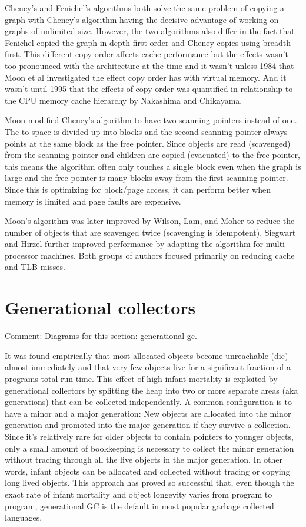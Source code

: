 \documentclass[a4paper,oneside]{memoir}
\newcommand{\makecomment}[1]{{\color{red} Comment: #1}}
\begin{document}
Cheney's and Fenichel's algorithms both solve the same problem of copying a graph
with Cheney's algorithm having the decisive advantage of working on graphs of
unlimited size. However, the two algorithms also differ in the fact that Fenichel
copied the graph in depth-first order and Cheney copies using breadth-first. This
different copy order affects cache performance but the effects wasn't too pronounced
with the architecture at the time and it wasn't unless 1984 that Moon et al
investigated the effect copy order has with virtual memory. And it wasn't until
1995 that the effects of copy order was quantified in relationship to the
CPU memory cache hierarchy by Nakashima and Chikayama.

Moon modified Cheney's algorithm to have two scanning pointers instead of one.
The to-space is divided up into blocks and the second scanning pointer always
points at the same block as the free pointer. Since objects are read (scavenged)
from the scanning pointer and children are copied (evacuated) to the free pointer,
this means the algorithm often only touches a single block even when the graph
is large and the free pointer is many blocks away from the first scanning pointer.
Since this is optimizing for block/page access, it can perform better when memory
is limited and page faults are expensive.

Moon's algorithm was later improved by Wilson, Lam, and Moher to reduce the
number of objects that are scavenged twice (scavenging is idempotent). Siegwart
and Hirzel further improved performance by adapting the algorithm for
multi-processor machines. Both groups of authors focused primarily on reducing
cache and TLB misses.

\section{Generational collectors}
\makecomment{Diagrams for this section: generational gc.}

It was found empirically that most allocated objects become unreachable (die)
almost immediately and that very few objects live for a significant fraction
of a programs total run-time. This effect of high infant mortality is exploited
by generational collectors by splitting the heap into two or more separate areas
(aka generations) that can be collected independently. A common configuration is
to have a minor and a major generation: New objects are allocated into the minor
generation and promoted into the major generation if they survive a collection.
Since it's relatively rare for older objects to contain pointers to younger
objects, only a small amount of bookkeeping is necessary to collect the minor
generation without tracing through all the live objects in the major generation.
In other words, infant objects can be allocated and collected without tracing or
copying long lived objects. This approach has proved so successful that, even
though the exact rate of infant mortality and object longevity varies from
program to program, generational GC is the default in most popular garbage
collected languages.
\end{document}
